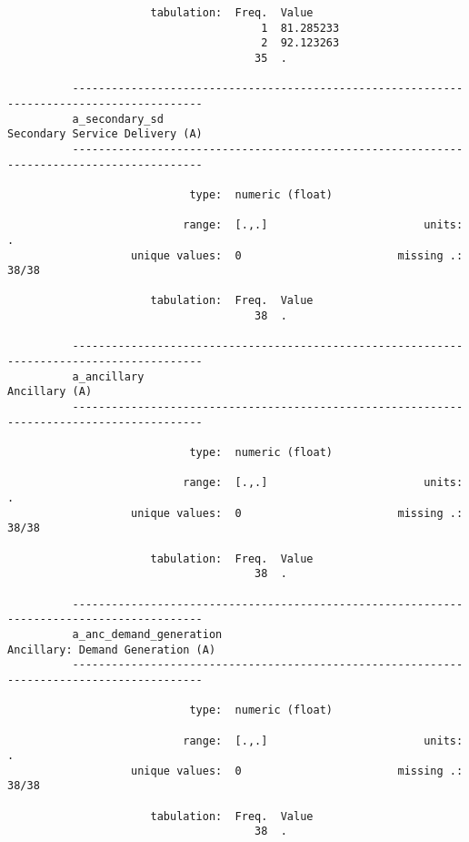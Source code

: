 \documentclass{article}
\begin{document}
\begin{verbatim}
                      tabulation:  Freq.  Value
                                       1  81.285233
                                       2  92.123263
                                      35  .
          
          ------------------------------------------------------------------------------------------
          a_secondary_sd                                              Secondary Service Delivery (A)
          ------------------------------------------------------------------------------------------
          
                            type:  numeric (float)
          
                           range:  [.,.]                        units:  .
                   unique values:  0                        missing .:  38/38
          
                      tabulation:  Freq.  Value
                                      38  .
          
          ------------------------------------------------------------------------------------------
          a_ancillary                                                                  Ancillary (A)
          ------------------------------------------------------------------------------------------
          
                            type:  numeric (float)
          
                           range:  [.,.]                        units:  .
                   unique values:  0                        missing .:  38/38
          
                      tabulation:  Freq.  Value
                                      38  .
          
          ------------------------------------------------------------------------------------------
          a_anc_demand_generation                                   Ancillary: Demand Generation (A)
          ------------------------------------------------------------------------------------------
          
                            type:  numeric (float)
          
                           range:  [.,.]                        units:  .
                   unique values:  0                        missing .:  38/38
          
                      tabulation:  Freq.  Value
                                      38  .
          

\end{verbatim}
\end{document}
